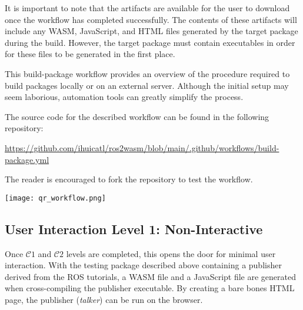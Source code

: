         It is important to note that the artifacts are available for the user to download once the workflow has completed successfully. The contents of these artifacts will include any \ac{WASM}, JavaScript, and \ac{HTML} files generated by the target package during the build. However, the target package must contain executables in order for these files to be generated in the first place.

        This \textsf{build-package} workflow provides an overview of the procedure required to build packages locally or on an external server. Although the initial setup may seem laborious, automation tools can greatly simplify the process. 

        \vspace{0.5em}
        \begin{tcolorbox}[title=Example 3]
            \begin{minipage}[t]{0.87\linewidth}
                \vspace*{0pt}
                The source code for the described workflow can be found in the following repository:

                \href{https://github.com/ihuicatl/ros2wasm/blob/main/.github/workflows/build-package.yml}{\footnotesize{\textsf{https://github.com/ihuicatl/ros2wasm/blob/main/.github/workflows/build-package.yml}}}

                The reader is encouraged to fork the repository to test the workflow.
            \end{minipage}\hfill%
            \begin{minipage}[t]{0.1\linewidth}
                \vspace*{0pt}
                \texttt{[image: qr\_workflow.png]}
            \end{minipage}
        \end{tcolorbox}

        \subsection{User Interaction Level 1: Non-Interactive}

        Once $\mathcal{C}1$ and $\mathcal{C}2$ levels are completed, this opens the door for minimal user interaction. With the testing package described above containing a publisher derived from the \ac{ROS} tutorials, a \ac{WASM} file and a JavaScript file are generated when cross-compiling the publisher executable. By creating a bare bones \ac{HTML} page, the publisher (\textit{talker}) can be run on the browser.

